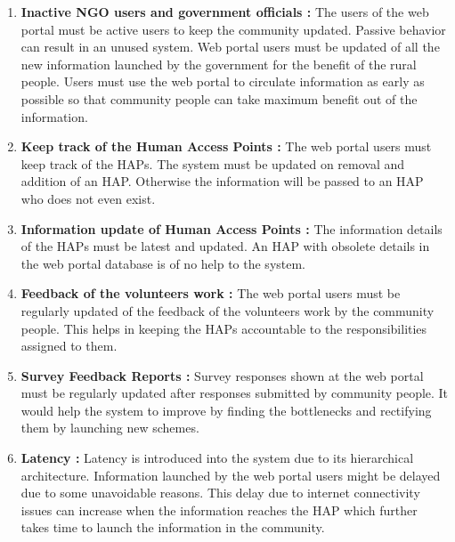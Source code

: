 \begin {enumerate}
\item\textbf{Inactive NGO users and government officials :} The users of the web portal must be active users to keep the community updated. Passive behavior can result in an unused system. Web portal users must be updated of all the new information launched by the government for the  benefit of the rural people. Users must use the web portal to circulate information as early as possible so that community people can take maximum benefit out of the information.   
\item\textbf{Keep track of the Human Access Points :} The web portal users must keep track of the HAPs. The system must be updated on removal and addition of an HAP. Otherwise the information will be passed to an HAP who does not even exist.
\item\textbf{Information update of Human Access Points :} The information details of the HAPs must be latest and updated. An HAP with obsolete details in the web portal database is of no help to the system.
\item\textbf{Feedback of the volunteers work :} The web portal users must be regularly updated of the feedback of the volunteers work by the community people. This helps in keeping the HAPs accountable to the responsibilities assigned to them. 
\item\textbf{Survey Feedback Reports :} Survey responses shown at the web portal must be regularly updated after responses submitted by community people. It would help the system to improve by finding the bottlenecks and rectifying them by launching new schemes. 
\item\textbf{Latency :} Latency is introduced into the system due to its hierarchical architecture. Information launched by the web portal users might be delayed due to some unavoidable reasons. This delay due to internet connectivity issues can increase when the information reaches the HAP which further takes time to launch the information in the community.
\end {enumerate}




